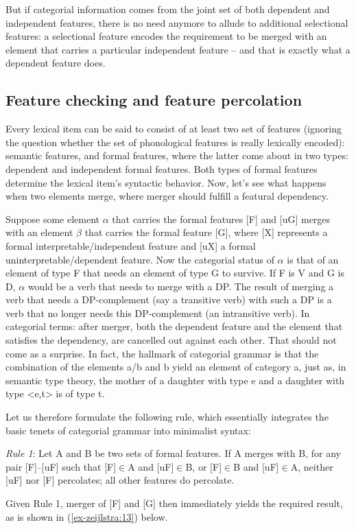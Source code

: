 \documentclass[output=paper
,modfonts
,nonflat]{langsci/langscibook}
\begin{document}
But if categorial information comes from the joint set of both dependent and independent features, there is no need anymore to allude to additional selectional features: a selectional feature encodes the requirement to be merged with an element that carries a particular independent feature – and that is exactly what a dependent feature does.

\subsection{Feature checking and feature percolation}
Every lexical item can be said to consist of at least two set of features (ignoring the question whether the set of phonological features is really lexically encoded): semantic features, and formal features, where the latter come about in two types: dependent and independent formal features. Both types of formal features determine the lexical item’s syntactic behavior. Now, let’s see what happens when two elements merge, where merger should fulfill a featural dependency.

Suppose some element $\alpha$ that carries the formal features {[}F{]} and {[}uG{]} merges with an element $\beta$ that carries the formal feature {[}G{]}, where {[}X{]} represents a formal interpretable\slash independent feature and {[}uX{]} a formal uninterpretable\slash dependent feature. Now the categorial status of $\alpha$ is that of an element of type F that needs an element of type G to survive. If F is V and G is D, $\alpha$ would be a verb that needs to merge with a DP. The result of merging a verb that needs a DP-complement (say a transitive verb) with such a DP is a verb that no longer needs this DP-complement (an intransitive verb). In categorial terms: after merger, both the dependent feature and the element that satisfies the dependency, are cancelled out against each other. That should not come as a surprise. In fact, the hallmark of categorial grammar is that the combination of the elements a/b and b yield an element of category a, just as, in semantic type theory, the mother of a daughter with type e and a daughter with type <e,t> is of type t. 

Let us therefore formulate the following rule, which essentially integrates the basic tenets of categorial grammar into minimalist syntax:

\begin{exe}
\ex \label{ex-zeijlstra:12}\textit{Rule 1}: Let A and B be two sets of formal features. If A merges with B, for any pair {[}F{]}--{[}uF{]} such that {[}F{]}$\in$A and {[}uF{]}$\in$B, or {[}F{]}$\in$B and {[}uF{]}$\in$A, neither {[}uF{]} nor {[}F{]} percolates; all other features do percolate.
\end{exe}
Given Rule 1, merger of {[}F{]} and {[}G{]} then immediately yields the required result, as is shown in (\ref{ex-zeijlstra:13}) below.
\end{document}
